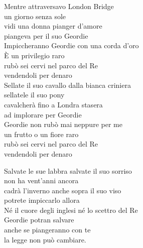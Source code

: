 \documentclass[10pt, twoside, a4paper]{article}
\begin{document}
\begin{multicols}{2}

Mentre attraversavo London Bridge\\
un giorno senza sole\\
vidi una donna pianger d'amore\\
piangeva per il suo Geordie\\

Impiccheranno Geordie con una corda d'oro\\
\`E un privilegio raro\\
rub\`o sei cervi nel parco del Re\\
vendendoli per denaro\\

Sellate il suo cavallo dalla bianca criniera\\
sellatele il suo pony\\
cavalcher\`a fino a Londra stasera\\
ad implorare per Geordie\\

Geordie non rub\`o mai neppure per me\\
un frutto o un fiore raro\\
rub\`o sei cervi nel parco del Re\\
vendendoli per denaro\\
\columnbreak

Salvate le sue labbra salvate il suo sorriso\\
non ha vent'anni ancora\\
cadr\`a l'inverno anche sopra il suo viso\\
potrete impiccarlo allora\\

N\'e il cuore degli inglesi n\'e lo scettro del Re\\
Geordie potran salvare\\
anche se piangeranno con te\\
la legge non pu\`o cambiare.\\


\end{multicols}
\end{document}
